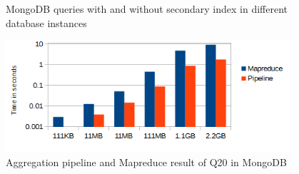 \begin{figure}
	\centering
	\centering
	\caption{MongoDB queries with and without secondary index in different database instances}
	\label{fig:xmark-mongodb-index-noindex}
\end{figure}

\begin{figure}
	\centering
	\includegraphics[width=0.95\textwidth]{img/result/mongodb/mongodb-mapreduce-pipeline}
	\caption{Aggregation pipeline and Mapreduce result of Q20 in MongoDB}
	\label{fig:xmark-result-mongodb-pipeline-mapreduce}
	
\end{figure}

